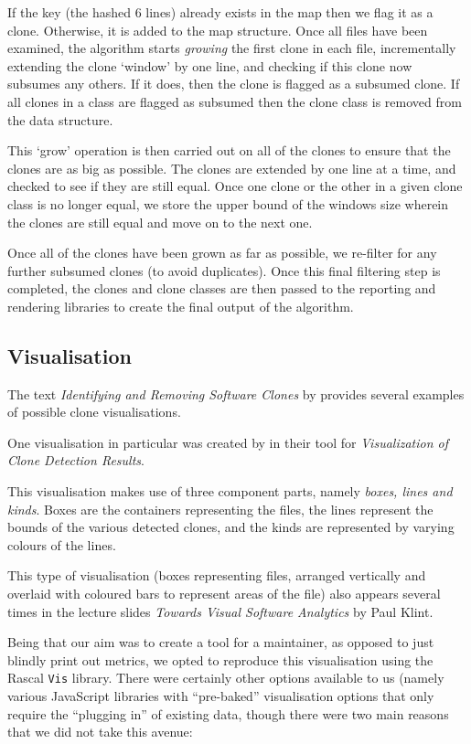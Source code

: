 \documentclass{article}
\begin{document}
If the key (the hashed 6 lines) already exists in the map then we flag it as a clone. Otherwise, it is added to the map structure. Once all files have been examined, the algorithm starts \textit{growing} the first clone in each file, incrementally extending the clone `window' by one line, and checking if this clone now subsumes any others. If it does, then the clone is flagged as a subsumed clone. If all clones in a class are flagged as subsumed then the clone class is removed from the data structure.

This `grow' operation is then carried out on all of the clones to ensure that the clones are as big as possible. The clones are extended by one line at a time, and checked to see if they are still equal. Once one clone or the other in a given clone class is no longer equal, we store the upper bound of the windows size wherein the clones are still equal and move on to the next one.

Once all of the clones have been grown as far as possible, we re-filter for any further subsumed clones (to avoid duplicates). Once this final filtering step is completed, the clones and clone classes are then passed to the reporting and rendering libraries to create the final output of the algorithm.

\subsection{Visualisation}

The text \textit{Identifying and Removing Software Clones} by \citeauthor{Koschke2008} provides several examples of possible clone visualisations.

One visualisation in particular was created by \citeauthor{Tairas:2006:VCD:1188835.1188846} in their tool for \textit{Visualization of Clone Detection Results}\cite{Tairas:2006:VCD:1188835.1188846}.

This visualisation makes use of three component parts, namely \textit{boxes, lines and kinds}. Boxes are the containers representing the files, the lines represent the bounds of the various detected clones, and the kinds are represented by varying colours of the lines.

This type of visualisation (boxes representing files, arranged vertically and overlaid with coloured bars to represent areas of the file) also appears several times in the lecture slides \textit{Towards Visual Software Analytics} by Paul Klint\cite{klintslides}.

Being that our aim was to create a tool for a maintainer, as opposed to just blindly print out metrics, we opted to reproduce this visualisation using the Rascal \texttt{Vis} library. There were certainly other options available to us (namely various JavaScript libraries with ``pre-baked'' visualisation options that only require the ``plugging in'' of existing data, though there were two main reasons that we did not take this avenue:
\end{document}
